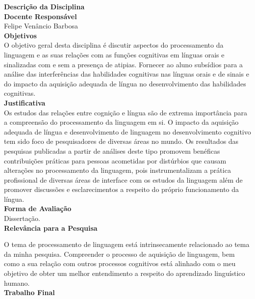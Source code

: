 \textbf{\Large Descrição da Disciplina}\\

\textbf{Docente Responsável}\\
\hspace*{1.6em}Felipe Venâncio Barbosa\\

\textbf{Objetivos}\\
\hspace*{1.6em}O objetivo geral desta disciplina é discutir aspectos do processamento da linguagem e as suas relações com as funções cognitivas em línguas orais e sinalizadas com e sem a presença de atipias. Fornecer ao aluno subsídios para a análise das interferências das habilidades cognitivas nas línguas orais e de sinais e do impacto da aquisição adequada de língua no desenvolvimento das habilidades cognitivas.\\

\textbf{Justificativa}\\
\hspace*{1.6em}Os estudos das relações entre cognição e língua são de extrema importância para a compreensão do processamento da linguagem em si. O impacto da aquisição adequada de língua e desenvolvimento de linguagem no desenvolvimento cognitivo tem sido foco de pesquisadores de diversas áreas no mundo. Os resultados das pesquisas publicadas a partir de análises deste tipo promovem benéficas contribuições práticas para pessoas acometidas por distúrbios que causam alterações no processamento da linguagem, pois instrumentalizam a prática profissional de diversas áreas de interface com os estudos da linguagem além de promover discussões e esclarecimentos a respeito do próprio funcionamento da língua.\\

\textbf{Forma de Avaliação}\\
\hspace*{1.6em}Dissertação.\\

\textbf{Relevância para a Pesquisa}

O tema de processamento de linguagem está intrinsecamente relacionado ao tema da minha pesquisa. Compreender o processo de aquisição de linguagem, bem como a sua relação com outros processos cognitivos está alinhado com o meu objetivo de obter um melhor entendimento a respeito do aprendizado linguístico humano.\\

\textbf{Trabalho Final}

